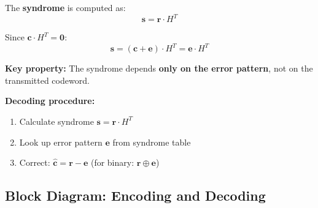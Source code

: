 The \textbf{syndrome} is computed as:
\begin{equation}
\mathbf{s} = \mathbf{r} \cdot H^T
\end{equation}

Since $\mathbf{c} \cdot H^T = \mathbf{0}$:
\begin{equation}
\mathbf{s} = (\mathbf{c} + \mathbf{e}) \cdot H^T = \mathbf{e} \cdot H^T
\end{equation}

\textbf{Key property:} The syndrome depends \textbf{only on the error pattern}, not on the transmitted codeword.

\textbf{Decoding procedure:}
\begin{enumerate}
\item Calculate syndrome $\mathbf{s} = \mathbf{r} \cdot H^T$
\item Look up error pattern $\mathbf{e}$ from syndrome table
\item Correct: $\hat{\mathbf{c}} = \mathbf{r} - \mathbf{e}$ (for binary: $\mathbf{r} \oplus \mathbf{e}$)
\end{enumerate}

\subsection{Block Diagram: Encoding and Decoding}

